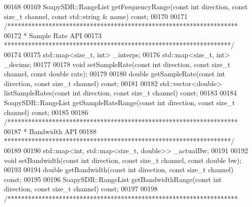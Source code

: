 \begin{DoxyCode}
00168 
00169     SoapySDR::RangeList getFrequencyRange(\textcolor{keyword}{const} \textcolor{keywordtype}{int} direction, \textcolor{keyword}{const} \textcolor{keywordtype}{size\_t} channel, \textcolor{keyword}{const} std::string &
      name) \textcolor{keyword}{const};
00170 
00171     \textcolor{comment}{/*******************************************************************}
00172 \textcolor{comment}{     * Sample Rate API}
00173 \textcolor{comment}{     ******************************************************************/}
00174 
00175     std::map<size\_t, int> _interps;
00176     std::map<size\_t, int> _decims;
00177 
00178     \textcolor{keywordtype}{void} setSampleRate(\textcolor{keyword}{const} \textcolor{keywordtype}{int} direction, \textcolor{keyword}{const} \textcolor{keywordtype}{size\_t} channel, \textcolor{keyword}{const} \textcolor{keywordtype}{double} 
      rate);
00179 
00180     \textcolor{keywordtype}{double} getSampleRate(\textcolor{keyword}{const} \textcolor{keywordtype}{int} direction, \textcolor{keyword}{const} \textcolor{keywordtype}{size\_t} channel) \textcolor{keyword}{const};
00181 
00182     std::vector<double> listSampleRates(\textcolor{keyword}{const} \textcolor{keywordtype}{int} direction, \textcolor{keyword}{const} \textcolor{keywordtype}{size\_t} channel) \textcolor{keyword}{const};
00183 
00184     SoapySDR::RangeList getSampleRateRange(\textcolor{keyword}{const} \textcolor{keywordtype}{int} direction, \textcolor{keyword}{const} \textcolor{keywordtype}{size\_t} channel) \textcolor{keyword}{const};
00185 
00186     \textcolor{comment}{/*******************************************************************}
00187 \textcolor{comment}{     * Bandwidth API}
00188 \textcolor{comment}{     ******************************************************************/}
00189 
00190     std::map<int, std::map<size\_t, double>> _actualBw;
00191 
00192     \textcolor{keywordtype}{void} setBandwidth(\textcolor{keyword}{const} \textcolor{keywordtype}{int} direction, \textcolor{keyword}{const} \textcolor{keywordtype}{size\_t} channel, \textcolor{keyword}{const} \textcolor{keywordtype}{double} bw);
00193 
00194     \textcolor{keywordtype}{double} getBandwidth(\textcolor{keyword}{const} \textcolor{keywordtype}{int} direction, \textcolor{keyword}{const} \textcolor{keywordtype}{size\_t} channel) \textcolor{keyword}{const};
00195 
00196     SoapySDR::RangeList getBandwidthRange(\textcolor{keyword}{const} \textcolor{keywordtype}{int} direction, \textcolor{keyword}{const} \textcolor{keywordtype}{size\_t} channel) \textcolor{keyword}{const};
00197 
00198     \textcolor{comment}{/*******************************************************************}

\end{DoxyCode}
